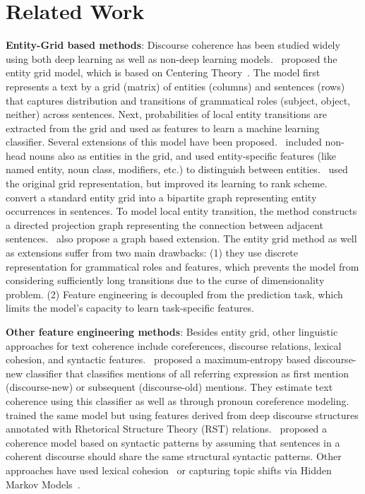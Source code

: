 \documentclass[11pt]{article}
\begin{document}
\iffalse
\section{Related Work}
\label{sec:related}
\noindent\textbf{Entity-Grid based methods}: Discourse coherence has been studied widely using both deep learning as well as non-deep learning models.~\cite{barzilay2008modeling} proposed the entity grid model, which is based on Centering Theory~\cite{grosz1995centering}. The model first represents a text by a grid (matrix) of entities (columns) and sentences (rows) that captures distribution and transitions of grammatical roles (subject, object, neither) across sentences. Next, probabilities of local entity transitions are extracted from the grid and used as features to learn a machine learning classifier. Several extensions of this model have been proposed.~\cite{elsner2008coreference} included non-head nouns also as entities in the grid, and used entity-specific features (like named entity, noun class, modifiers, etc.) to distinguish between entities.~\cite{feng2012extending} used the original grid representation, but improved its learning to rank scheme.~\cite{guinaudeau2013graph} convert a standard entity grid into a bipartite graph representing entity occurrences in sentences. To model local entity transition, the method constructs a directed projection graph representing the connection between adjacent sentences.~\cite{mesgar2015graph} also propose a graph based extension. The entity grid method as well as extensions suffer from two main drawbacks: (1) they use discrete representation for grammatical roles and features, which prevents the model from considering sufficiently long transitions due to the curse of dimensionality problem. (2) Feature engineering is decoupled from the prediction task, which limits the model's capacity to learn task-specific features. 

\noindent\textbf{Other feature engineering methods}: Besides entity grid, other linguistic approaches for text coherence include coreferences, discourse relations, lexical cohesion, and syntactic features.~\cite{elsner2008coreference} proposed a maximum-entropy based discourse-new classifier that classifies mentions of all referring expression as first mention (discourse-new) or subsequent (discourse-old) mentions. They estimate text coherence using this classifier as well as through pronoun coreference modeling.~\cite{feng2014impact} trained the same model but using features derived from deep discourse structures annotated with Rhetorical Structure Theory (RST) relations.~\cite{louis2012coherence} proposed a coherence model based on syntactic patterns by assuming that sentences in a coherent discourse should share the same structural syntactic patterns. Other approaches have used lexical cohesion~\cite{morris1991lexical,somasundaran2014lexical} or capturing topic shifts via Hidden Markov Models~\cite{barzilay2004catching}. 
\end{document}
